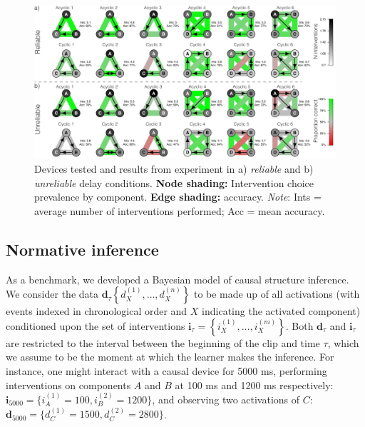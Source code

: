 \documentclass[10pt,letterpaper]{article}
\newcommand{\ci}{\mathbf{i}} %
\newcommand{\da}{\mathbf{d}} %
\begin{document}

\begin{figure}[t]
   \centering
   \vspace{-.89cm}
   \includegraphics[width = .85\textwidth]{results_cond_numbered}
   \caption{Devices tested and results from experiment in a) \emph{reliable} and b) \emph{unreliable} delay conditions.  \textbf{Node shading:} Intervention choice prevalence by component.  \textbf{Edge shading:} accuracy. \emph{Note}: Ints = average number of interventions performed; Acc = mean accuracy.}
   \label{fig:results_cond}
   \vspace{-0.4cm}
\end{figure}

\subsection{Normative inference}
As a benchmark, we developed a Bayesian model of causal structure inference.  We consider the data $\da_{\tau}\left\{ d_X^{(1)},\ldots, d_X^{(n)} \right\}$ to be made up of all activations (with events indexed in chronological order and $X$ indicating the activated component) conditioned upon the set of interventions $\ci_{\tau}=\left\{i_X^{(1)},\ldots, i_X^{(m)} \right\}$. Both $\da_{\tau}$ and $\ci_{\tau}$ are restricted to the interval between the beginning of the clip and time $\tau$, which we assume to be the moment at which the learner makes the inference.  For instance, one might interact with a causal device for 5000 ms, performing interventions on components $A$ and $B$ at 100 ms and
 1200 ms respectively: $\ci_{5000} = \{i_A^{(1)}=100, i_B^{(2)}=1200\}$, and observing two activations of $C$: $\da_{5000} = \{ d^{(1)}_C=1500, d^{(2)}_C=2800\}$.
\end{document}
